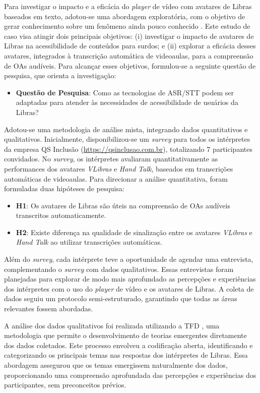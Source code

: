 Para investigar o impacto e a eficácia do \textit{player} de vídeo com avatares de Libras baseados em texto, adotou-se uma abordagem exploratória, com o objetivo de gerar conhecimento sobre um fenômeno ainda pouco conhecido \cite{CastroFilho2021}. Este estudo de caso visa atingir dois principais objetivos: (i) investigar o impacto de avatares de Libras na acessibilidade de conteúdos para surdos; e (ii) explorar a eficácia desses avatares, integrados à transcrição automática de videoaulas, para a compreensão de OAs audíveis. Para alcançar esses objetivos, formulou-se a seguinte questão de pesquisa, que orienta a investigação:

\begin{itemize}
\item \textbf{Questão de Pesquisa}: Como as tecnologias de ASR/STT podem ser adaptadas para atender às necessidades de acessibilidade de usuários da Libras?
\end{itemize}

Adotou-se uma metodologia de análise mista, integrando dados quantitativos e qualitativos. Inicialmente, disponibilizou-se um \textit{survey} para todos os intérpretes da empresa QS Inclusão (\url{https://qsinclusao.com.br}), totalizando 7 participantes convidados. No \textit{survey}, os intérpretes avaliaram quantitativamente as performances dos avatares \textit{VLibras} e \textit{Hand Talk}, baseados em transcrições automáticas de videoaulas. Para direcionar a análise quantitativa, foram formuladas duas hipóteses de pesquisa:

\begin{itemize}
\item \textbf{H1}: Os avatares de Libras são úteis na compreensão de OAs audíveis transcritos automaticamente.
\item \textbf{H2}: Existe diferença na qualidade de sinalização entre os avatares \textit{VLibras} e \textit{Hand Talk} ao utilizar transcrições automáticas.
\end{itemize}

Além do \textit{survey}, cada intérprete teve a oportunidade de agendar uma entrevista, complementando o \textit{survey} com dados qualitativos. Essas entrevistas foram planejadas para explorar de modo mais aprofundado as percepções e experiências dos intérpretes com o uso do \textit{player} de vídeo e os avatares de Libras. A coleta de dados seguiu um protocolo semi-estruturado, garantindo que todas as áreas relevantes fossem abordadas.

A análise dos dados qualitativos foi realizada utilizando a TFD \cite{Charmaz2009}, uma metodologia que permite o desenvolvimento de teorias emergentes diretamente dos dados coletados. Este processo envolveu a codificação aberta, identificando e categorizando os principais temas nas respostas dos intérpretes de Libras. Essa abordagem assegurou que os temas emergissem naturalmente dos dados, proporcionando uma compreensão aprofundada das percepções e experiências dos participantes, sem preconceitos prévios.

